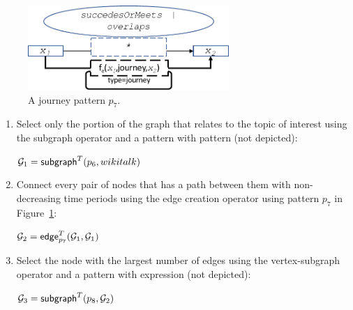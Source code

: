 \begin{figure}
\centering
\includegraphics[width=3in]{figs/journeys.pdf}
\caption{A journey pattern $p_7$.}
\vspace{-0.2cm}
\label{fig:journeysp}
\vspace{-0.2cm}
\end{figure}

\begin{enumerate}[itemindent=\dimexpr\labelwidth+\labelsep\relax,leftmargin=0pt]
\item Select only the portion of the graph that relates to the topic
  of interest using the subgraph operator and a pattern with
   pattern (not depicted):

$\mathcal{G}_1 = \textsf{subgraph}^T(p_6,wikitalk)$

\item Connect every pair of nodes that has a path between them with non-decreasing time periods using the edge creation operator using pattern $p_7$ in Figure~\ref{fig:journeysp}:

$\mathcal{G}_2 = \textsf{edge}^T_{p_7}(\mathcal{G}_1,\mathcal{G}_1)$


\item Select the node with the largest number of edges using the vertex-subgraph operator and a pattern with  expression (not depicted):

$\mathcal{G}_3 = \textsf{subgraph}^T(p_8,\mathcal{G}_2)$
\end{enumerate}
